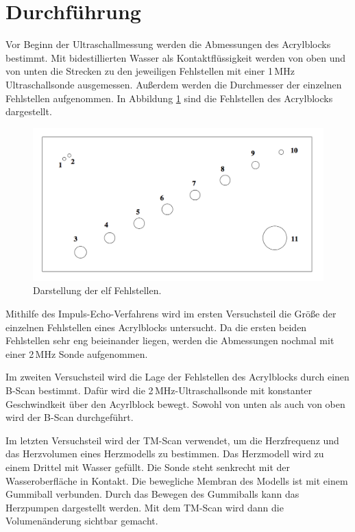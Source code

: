\section{Durchführung}
Vor Beginn der Ultraschallmessung werden die Abmessungen des Acrylblocks bestimmt.
Mit bidestillierten Wasser als Kontaktflüssigkeit werden von oben und von unten die
Strecken zu den jeweiligen Fehlstellen mit einer 1\,MHz Ultraschallsonde ausgemessen.
Außerdem werden die Durchmesser der einzelnen Fehlstellen aufgenommen.
\newline
In Abbildung \ref{fig:fehl} sind die Fehlstellen des Acrylblocks dargestellt.
\begin{figure}
  \centering
  \includegraphics[scale=0.40]{fehlstellen.png}
  \caption{Darstellung der elf Fehlstellen.\cite{anleitung}}
  \label{fig:fehl}
\end{figure}
\newpage
Mithilfe des Impuls-Echo-Verfahrens wird im ersten Versuchsteil die Größe der einzelnen Fehlstellen
eines Acrylblocks untersucht.
Da die ersten beiden Fehlstellen sehr eng beieinander liegen, werden die Abmessungen
nochmal mit einer 2\,MHz Sonde aufgenommen.

Im zweiten Versuchsteil wird die Lage der Fehlstellen des Acrylblocks durch einen B-Scan bestimmt.
Dafür wird die 2\,MHz-Ultraschallsonde mit konstanter Geschwindkeit über den Acyrlblock bewegt.
Sowohl von unten als auch von oben wird der B-Scan durchgeführt.

Im letzten Versuchsteil wird der TM-Scan verwendet, um die Herzfrequenz und das Herzvolumen
eines Herzmodells zu bestimmen. Das Herzmodell wird zu einem Drittel mit Wasser gefüllt.
Die Sonde steht senkrecht mit der Wasseroberfläche in Kontakt. Die bewegliche Membran des
Modells ist mit einem Gummiball verbunden. Durch das Bewegen des Gummiballs kann das Herzpumpen
dargestellt werden. Mit dem TM-Scan wird dann die Volumenänderung sichtbar gemacht.
